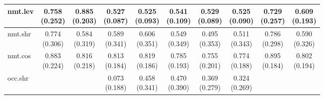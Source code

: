 \documentclass[epsfig,a4paper,11pt,titlepage,twoside,openany]{book}
\begin{document}
\begin{table}[H]
\begin{tabular}{l|c|c|c|c|c|c|c|c|c|}
\multicolumn{1}{|l|}{nmt.lev}            & \makecell{0.758 \\ (0.252)}  & \makecell{0.885 \\ (0.203)} & \makecell{0.527 \\ (0.087)} & \makecell{0.525 \\ (0.093)} & \makecell{0.541 \\ (0.109)} & \makecell{0.529 \\ (0.089)} & \makecell{0.525 \\ (0.090)} & \makecell{0.729 \\ (0.257)}    & \makecell{0.609 \\ (0.193)}   \\ \hline
\multicolumn{1}{|l|}{nmt.shr}                 & \makecell{0.774 \\ (0.306)}  & \makecell{0.584 \\ (0.319)} & \makecell{0.589 \\ (0.341)} & \makecell{0.606 \\ (0.351)} & \makecell{0.549 \\ (0.349)} & \makecell{0.495 \\ (0.353)} & \makecell{0.511 \\ (0.343)} & \makecell{0.786 \\ (0.298)}    & \makecell{0.590 \\ (0.326)}   \\ \hline
\multicolumn{1}{|l|}{nmt.cos} & \makecell{0.883 \\ (0.224)}  & \makecell{0.816 \\ (0.218)} & \makecell{0.813 \\ (0.184)} & \makecell{0.819 \\ (0.186)} & \makecell{0.785 \\ (0.193)} & \makecell{0.755 \\ (0.201)} & \makecell{0.774 \\ (0.188)} & \makecell{0.895 \\ (0.184)}    & \makecell{0.802 \\ (0.194)}   \\ \hline
\multicolumn{1}{|l|}{occ.shr}                  &               &              & \makecell{0.073 \\ (0.188)} & \makecell{0.458 \\ (0.341)} & \makecell{0.470 \\ (0.390)} & \makecell{0.369 \\ (0.279)} & \makecell{0.324 \\ (0.269)} &                 &                \\ \hline

\end{tabular}
\end{table}
\end{document}
